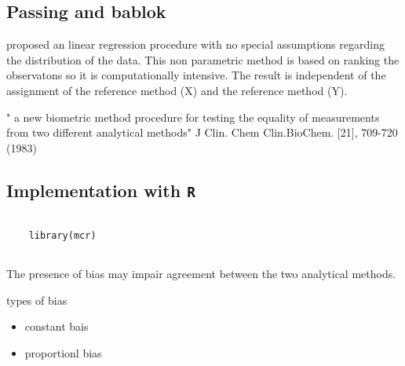 \documentclass[12pt, a4paper]{report}
\theoremstyle{plain}
\theoremstyle{definition}
\theoremstyle{remark}
\begin{document}
\subsection{Passing and bablok}
proposed an linear regression procedure with no special assumptions regarding the distribution of the data.
This non parametric method is based on ranking the observatons so it is computationally intensive.
The result is independent of the assignment of the reference method (X) and the reference method (Y).

" a new biometric method procedure for testing the equality of measurements from two different analytical methods"
J Clin. Chem Clin.BioChem. [21], 709-720 (1983)
\subsection{Implementation with \texttt{R}}

\begin{framed}
	\begin{verbatim}
	
	library(mcr)
	
	\end{verbatim}
\end{framed}
The presence of bias may impair agreement between the two analytical methods.

types of bias

\begin{itemize}
	\item constant bais
	\item proportionl bias
\end{itemize}










\end{document}
